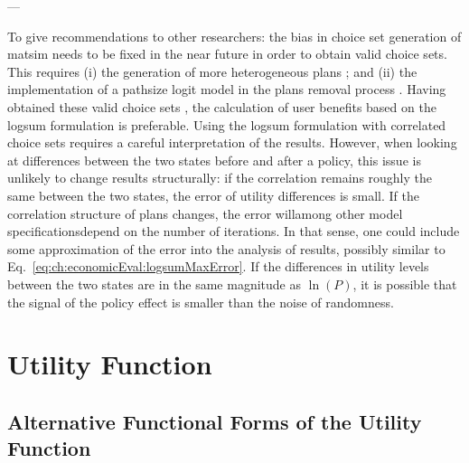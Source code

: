 ---

To give recommendations to other researchers: the bias in choice set generation of \gls{matsim} needs to be fixed in the near future in order to obtain valid choice sets.
%
This requires (i) the generation of more heterogeneous plans \citep[see, e.g.,][for such attempts in the \acrshort{pt} and in the car mode, respectively]{Moyo2013PhD, NagelKickhoeferJoubert2014HeterogeneousVoTsPROCEDIA}; and (ii) the implementation of a pathsize logit model in the plans removal process \citep[see, e.g.,][]{Grether2014PhD}.
%
Having obtained these valid choice sets \citep{NagelFloetteroed2009IatbrResourceInBook}, the calculation of user benefits based on the logsum formulation is preferable.
%
%
Using the logsum formulation with correlated choice sets requires a careful interpretation of the results. However, when looking at differences between the two states before and after a policy, this issue is unlikely to change results structurally: if the correlation remains roughly the same between the two states, the error of utility differences is small. If the correlation structure of plans changes, the error will\textemdash among other model specifications\textemdash depend on the number of iterations.
%
%
In that sense, one could include some approximation of the error into the analysis of results, possibly similar to Eq.~\ref{eq:ch:economicEval:logsumMaxError}. If the differences in utility levels between the two states are in the same magnitude as $\ln(P)$, it is possible that the signal of the policy effect is smaller than the noise of randomness.

\section{Utility Function}
\label{sec:future-of-scoring-function}

\subsection{Alternative Functional Forms of the Utility Function}
\label{sec:alternative-functions}

